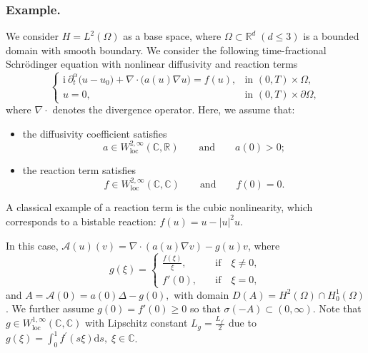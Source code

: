 \documentclass[reqno]{amsart}
\numberwithin{equation}{section}
\def \d {\mathrm{d}}
\begin{document}
\subsubsection*{\textbf{Example.}}
We consider \(H = L^2(\Omega)\) as a base space, where $\Omega \subset \mathbb{R}^d\;(d \le 3)$ is a bounded domain with smooth boundary. We consider the following time-fractional Schrödinger equation with nonlinear diffusivity and reaction terms
\begin{equation}\label{eq_ex}
\begin{cases}
\mathrm{i}~\partial_t^\alpha \big(u-u_0\big) +\nabla\cdot\big(a(u) \nabla u\big) = f(u), 
& \text{in } (0,T)\times \Omega,\\
u = 0, & \text{in } (0,T)\times \partial \Omega,
\end{cases}
\end{equation}
where $\nabla\cdot$ denotes the divergence operator. Here, we assume that:
\begin{itemize}
    \item the diffusivity coefficient satisfies
		\begin{equation}\label{assumption 1}
			a \in W^{2,\infty}_{\mbox{loc}}(\mathbb{C},\mathbb{R})\qquad \mbox{and}\qquad a(0)>0;
		\end{equation}
		\item the reaction term satisfies
		\begin{equation}\label{assumption 2}
			f\in W^{2,\infty}_{\mbox{loc}}(\mathbb{C},\mathbb{C})\qquad \mbox{and}\qquad f(0)=0.
		\end{equation}
    \end{itemize}
A classical example of a reaction term is the cubic nonlinearity, which corresponds to a bistable reaction: \( f(u) = u - |u|^2 u. \)
        
In this case, $\mathcal{A}(u)(v)=\nabla\cdot(a(u)\nabla v)-g(u)v$, where $$g(\xi)=\begin{cases}
	\frac{f(\xi)}{\xi}, \quad &\mbox{if}\quad \xi\neq 0,\\
	f'(0), \quad &\mbox{if}\quad \xi=0,
\end{cases}$$
and $A=\mathcal{A}(0)=a(0)\Delta-g(0),$ with domain $D(A)=H^2(\Omega)\cap H^1_0(\Omega)$. 
We further assume $g(0)=f'(0)\ge 0$ so that $\sigma(-A)\subset (0,\infty)$. Note that $g \in W^{1,\infty}_{\mbox{loc}}(\mathbb{C},\mathbb{C})$ with Lipschitz constant $L_g =\frac{L_{f^\prime}}{2}$ due to $g(\xi)=\displaystyle\int_0^1 f^\prime(s\xi)\d s,\; \xi\in\mathbb{C}$.
\end{document}
